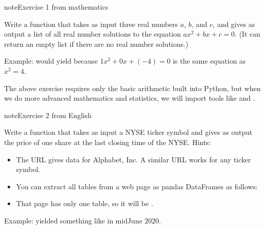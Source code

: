 \documentclass[letterpaper,10pt,english]{sphinxmanual}
\begin{document}
\begin{sphinxadmonition}{note}{Exercise 1 \sphinxhyphen{} from mathematics}

Write a function  that takes as input three real numbers \(a\), \(b\), and \(c\), and gives as output a list of all real number solutions to the equation \(ax^2+bx+c=0\).  (It can return an empty list if there are no real number solutions.)

Example:  would yield \sphinxcode{\sphinxupquote{{[}\sphinxhyphen{}2,2{]}}} because \(1x^2+0x+(-4)=0\) is the same equation as \(x^2=4\).
\end{sphinxadmonition}

The above exercise requires only the basic arithmetic built into Python, but when we do more advanced mathematics and statistics, we will import tools like  and .

\begin{sphinxadmonition}{note}{Exercise 2 \sphinxhyphen{} from English}

Write a function  that takes as input a NYSE ticker symbol and gives as output the price of one share at the last closing time of the NYSE.  Hints:
\begin{itemize}
\item {} 
The URL  gives data for Alphabet, Inc.  A similar URL works for any ticker symbol.

\item {} 
You can extract all tables from a web page as pandas DataFrames as follows:

\end{itemize}

\begin{sphinxVerbatim}[commandchars=\\\{\}]
    
\end{sphinxVerbatim}
\begin{itemize}
\item {} 
That page has only one table, so it will be .

\end{itemize}

Example:  yielded something like  in mid\sphinxhyphen{}June 2020.
\end{sphinxadmonition}
\end{document}
